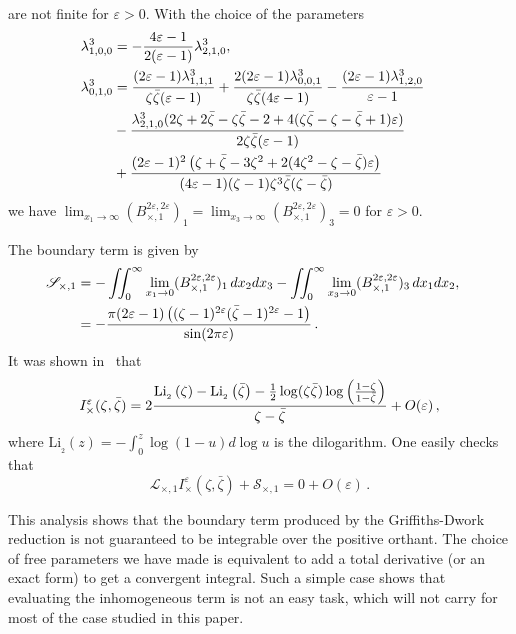 \documentclass[a4paper,12pt]{article}
\numberwithin{equation}{section}
\numberwithin{figure}{section}
\def\Li#1(#2){\textrm{Li}_{#1}\left(#2\right)}
\begin{document}
are not finite for $\varepsilon>0$.
With the choice of the parameters 
\begin{align}
 \lambda^3_{1,0,0}&= -\frac{4 \varepsilon -1 }{2 (\varepsilon
                       -1)} \lambda^3_{2,1,0},\cr
                       \lambda^3_{0,1,0}&=\frac{(2 \varepsilon -1) \lambda^3_{1,1,1}}{\zeta  \bar\zeta (\varepsilon
   -1)}+\frac{2 (2 \varepsilon -1) \lambda^3_{0,0,1}}{\zeta  \bar\zeta (4 \varepsilon
                                          -1)}-\frac{(2 \varepsilon -1)
   \lambda^3_{1,2,0}}{\varepsilon -1}\cr
                                          &-\frac{\lambda^3_{2,1,0} (2 \zeta +2 \bar\zeta-\zeta  \bar\zeta -2+4( \zeta  \bar\zeta - \zeta  - \bar\zeta 
                                            +1 )\varepsilon)}{2 \zeta  \bar\zeta (\varepsilon -1)}\cr
                                            &+\frac{(2 \varepsilon -1)^2 \left(\zeta
   +\bar\zeta -3 \zeta ^2+2 (4\zeta ^2  - \zeta   - \bar\zeta) \varepsilon
   \right)}{ (4 \varepsilon -1)(\zeta -1) \zeta ^3 \bar\zeta (\zeta -\bar\zeta)}
\end{align}
we have
$\lim_{x_1\to\infty}(B^{2\varepsilon,2\varepsilon}_{\times,1})_1=\lim_{x_3\to\infty}(B^{2\varepsilon,2\varepsilon}_{\times,1})_3=0$
for $\varepsilon>0$. 


The boundary term is given by
  \begin{align}
    \mathscr{S}_{\times,1}&=-\iint_0^\infty
\lim_{x_1\to0}
  (B^{2\varepsilon,2\varepsilon}_{\times,1})_1\,dx_2dx_3
-\iint_0^\infty
\lim_{x_3\to0}
                            (B^{2\varepsilon,2\varepsilon}_{\times,1})_3\,dx_1dx_2,\cr
                            &=-\frac{\pi  (2 \varepsilon -1) \left((\zeta -1)^{2 \varepsilon }
   (\bar\zeta-1)^{2 \varepsilon }-1\right)}{ \sin (2 \pi  \varepsilon ) }\,.
\end{align}  
%
It was shown in~\cite{Heckelbacher:2022fbx} that
\begin{equation}
   I^\varepsilon_\times(\zeta,\bar\zeta)=
   2{\Li_2(\zeta)-\Li_2(\bar\zeta)-\frac12\log(\zeta\bar\zeta)\log\left(1-\zeta\over
    1-\bar\zeta \right) \over \zeta-\bar\zeta}+O(\varepsilon)\,,
\end{equation}
where $\Li_2(z)=-\int_0^z \log(1-u)d\log u$ is the dilogarithm.
One easily checks that
\begin{equation}
  \mathscr{L}_{\times,1}     I^\varepsilon_\times(\zeta,\bar\zeta)+ \mathscr{S}_{\times,1} =0+O(\varepsilon)\,.
\end{equation}


This analysis shows that the boundary term produced by the
Griffiths-Dwork reduction is not guaranteed to be integrable over the
positive orthant. The choice of free parameters we have made is
equivalent to add a total derivative (or an exact form) to get a
convergent integral.
Such a simple case shows that evaluating the
inhomogeneous term is not an easy task, which will not carry for most
of the case studied in this paper. 
\end{document}
